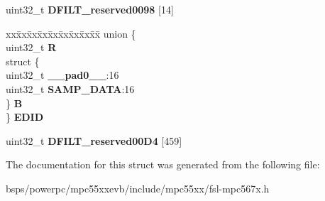 \begin{DoxyCompactItemize}
\begin{tabbing}
\end{tabbing}\item 
\mbox{\label{structDECFIL__tag_ad0ee4e937ae15fc10d2e70d00b0a384c}} 
uint32\+\_\+t {\bfseries D\+F\+I\+L\+T\+\_\+reserved0098} \mbox{[}14\mbox{]}
\item 
\mbox{\label{structDECFIL__tag_ae6d21031ea6454484410206a165d7fc1}} 
\begin{tabbing}
xx\=xx\=xx\=xx\=xx\=xx\=xx\=xx\=xx\=\kill
union \{\\
\>uint32\_t {\bfseries R}\\
\>struct \{\\
\>\>uint32\_t {\bfseries \_\_pad0\_\_}:16\\
\>\>uint32\_t {\bfseries SAMP\_DATA}:16\\
\>\} {\bfseries B}\\
\} {\bfseries EDID}\\

\end{tabbing}\item 
\mbox{\label{structDECFIL__tag_a3b5b903cd95a49482f068da5d6499fab}} 
uint32\+\_\+t {\bfseries D\+F\+I\+L\+T\+\_\+reserved00\+D4} \mbox{[}459\mbox{]}
\end{DoxyCompactItemize}


The documentation for this struct was generated from the following file\+:\begin{DoxyCompactItemize}
\item 
bsps/powerpc/mpc55xxevb/include/mpc55xx/fsl-\/mpc567x.\+h\end{DoxyCompactItemize}

